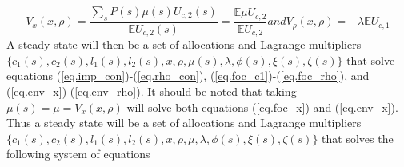 \documentclass[thmsb,11pt]{article}
\begin{document}
\begin{subequations}
\begin{equation}
	V_x(x,\rho)= \frac{\sum_sP(s) \mu(s) U_{c,2}(s)}{\mathbb E U_{c,2}(s)} = \frac{\mathbb E\mu U_{c,2}}{\mathbb E U_{c,2}}\label{eq.env_x}
\end{equation}and
\begin{equation}
	V_\rho(x,\rho) = -\lambda \mathbb E U_{c,1}\label{eq.env_rho}
\end{equation}\end{subequations}  A steady state will then be a set of allocations and Lagrange multipliers $\{c_1(s),c_2(s),l_1(s),l_2(s),x,\rho,\mu(s),\lambda,\phi(s),\xi(s),\zeta(s)\}$  that solve equations (\ref{eq.imp_con})-(\ref{eq.rho_con}), (\ref{eq.foc_c1})-(\ref{eq.foc_rho}), and (\ref{eq.env_x})-(\ref{eq.env_rho}).  It should be noted that taking $\mu(s) = \mu = V_x(x,\rho)$ will solve both equations (\ref{eq.foc_x}) and (\ref{eq.env_x}).  Thus a steady state will be a set of allocations and Lagrange multipliers $\{c_1(s),c_2(s),l_1(s),l_2(s),x,\rho,\mu,\lambda,\phi(s),\xi(s),\zeta(s)\}$ that solves the following system of equations
\end{document}
